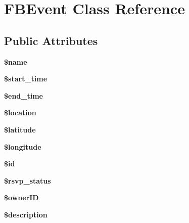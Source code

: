 \hypertarget{class_f_b_event}{
\section{FBEvent Class Reference}
\label{class_f_b_event}
}
\subsection*{Public Attributes}
\begin{DoxyCompactItemize}
\item 
\hypertarget{class_f_b_event_a8f2028ffc263d9370af42827260b190d}{
{\bfseries \$name}}
\label{class_f_b_event_a8f2028ffc263d9370af42827260b190d}

\item 
\hypertarget{class_f_b_event_ad86f3103faa00c9345cdba2caf47b97a}{
{\bfseries \$start\_\-time}}
\label{class_f_b_event_ad86f3103faa00c9345cdba2caf47b97a}

\item 
\hypertarget{class_f_b_event_a63cc2d2607cf057dd88ee9ca0f6a0097}{
{\bfseries \$end\_\-time}}
\label{class_f_b_event_a63cc2d2607cf057dd88ee9ca0f6a0097}

\item 
\hypertarget{class_f_b_event_a90a826ffa5168b7ac65eb4c4f27a1154}{
{\bfseries \$location}}
\label{class_f_b_event_a90a826ffa5168b7ac65eb4c4f27a1154}

\item 
\hypertarget{class_f_b_event_ac98a15564626fd66aad7d4a06766fd38}{
{\bfseries \$latitude}}
\label{class_f_b_event_ac98a15564626fd66aad7d4a06766fd38}

\item 
\hypertarget{class_f_b_event_a01c53ded0a650766ba2a98b1ed8e704b}{
{\bfseries \$longitude}}
\label{class_f_b_event_a01c53ded0a650766ba2a98b1ed8e704b}

\item 
\hypertarget{class_f_b_event_a44ad43657907bb6f6f0709353b84ee92}{
{\bfseries \$id}}
\label{class_f_b_event_a44ad43657907bb6f6f0709353b84ee92}

\item 
\hypertarget{class_f_b_event_abdb494502a2f4a95ebcc052ef2f01137}{
{\bfseries \$rsvp\_\-status}}
\label{class_f_b_event_abdb494502a2f4a95ebcc052ef2f01137}

\item 
\hypertarget{class_f_b_event_a5735970069b027c038b7b49e020564c7}{
{\bfseries \$ownerID}}
\label{class_f_b_event_a5735970069b027c038b7b49e020564c7}

\item 
\hypertarget{class_f_b_event_a4a2790eee17618a742e0558fc94ee901}{
{\bfseries \$description}}
\label{class_f_b_event_a4a2790eee17618a742e0558fc94ee901}

\end{DoxyCompactItemize}


